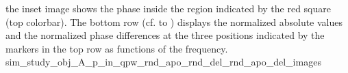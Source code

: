 { the inset image shows
 the phase inside
 the region indicated by
 the red square 
 (top colorbar).
 The bottom row
 (cf.
  to
 ) displays
 the normalized absolute values and
 the normalized phase differences at
 the three positions indicated by
 the markers in
 the top row as
 functions of
 the frequency.
}%
{sim_study_obj_A_p_in_qpw_rnd_apo_rnd_del_rnd_apo_del_images}

